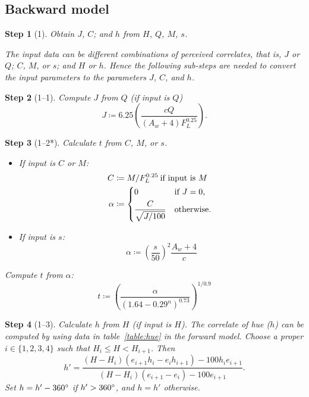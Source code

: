 \documentclass[twocolumn]{scrartcl}
\theoremstyle{named}
\newtheorem*{step}{Step}
\begin{document}
\subsection{Backward model}

\begin{step}[1]
  Obtain $J$, $C$; and $h$ from $H$, $Q$, $M$, $s$.

  The input data can be different combinations of perceived correlates, that
  is, $J$ or $Q$; $C$, $M$, or $s$; and $H$ or $h$. Hence the following
  sub-steps are needed to convert the input parameters to the parameters $J$,
  $C$, and $h$.
\end{step}

\begin{step}[1--1]
Compute $J$ from $Q$ (if input is $Q$)
\[
  J\coloneqq 6.25 \left(\frac{cQ}{(A_w+4) F_L^{0.25}}\right).
\]
\end{step}

\begin{step}[1--2*]
Calculate $t$ from $C$, $M$, or $s$.
\begin{itemize}
  \item If input is $C$ or $M$:
    \begin{align*}
      C &\coloneqq M / F_L^{0.25} \:\text{if input is $M$}\\
      \alpha &\coloneqq \begin{dcases*}
          0 &if $J=0$,\\
          \frac{C}{\sqrt{J/100}}& otherwise.
      \end{dcases*}
    \end{align*}
  \item If input is $s$:
    \[
    \alpha \coloneqq {\left(\frac{s}{50}\right)}^2 \frac{A_w+4}{c}
    \]
\end{itemize}
Compute $t$ from $\alpha$:
\[
  t \coloneqq {\left(\frac{\alpha}{{(1.64 - 0.29^n)}^{0.73}}\right)}^{1/0.9}
\]
\end{step}

\begin{step}[1--3]
Calculate $h$ from $H$ (if input is $H$).
The correlate of hue ($h$) can be computed by using data in
table~\ref{table:hue} in the forward model.
Choose a proper $i\in\{1,2,3,4\}$ such that
$H_i \le H < H_{i+1}$. Then
\[
  h' = \frac{(H-H_i)(e_{i+1}h_i - e_i h_{i+1}) - 100 h_i e_{i+1}}{(H-H_i)(e_{i+1}-e_i) - 100 e_{i+1}}.
\]
Set $h = h' - 360\degree$ if $h' > 360\degree$, and $h=h'$ otherwise.
\end{step}
\end{document}
